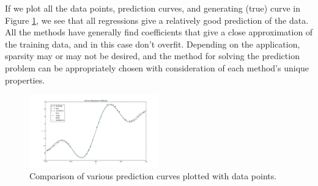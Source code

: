 \documentclass[10pt]{paper}
\begin{document}
If we plot all the data points, prediction curves, and generating (true) curve in Figure \ref{fig:everything}, we see that all regressions give a relatively good prediction of the data. All the methods have generally find coefficients that give a close approximation of the training data, and in this case don't overfit. Depending on the application, sparsity may or may not be desired, and the method for solving the prediction problem can be appropriately chosen with consideration of each method's unique properties.

\begin{figure}[H]
  \centering
  \label{fig:everything}
  \includegraphics[width=0.5\textwidth]{../images/everything.png}
  \caption{Comparison of various prediction curves plotted with data points.}
\end{figure}
\end{document}
